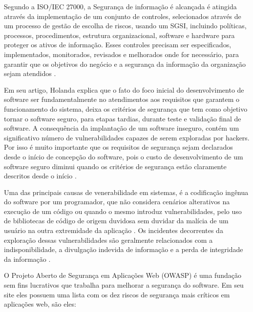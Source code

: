 Segundo a ISO/IEC 27000, a Segurança de informação é alcançada é atingida através da implementação de um conjunto de controles, selecionados através de um processo de gestão de escolha de riscos, usando um SGSI, incluindo políticas, processos, procedimentos, estrutura organizacional, software e hardware para proteger os ativos de informação. Esses controles precisam ser especificados, implementados, monitorados, revisados e melhorados onde for necessário, para garantir que  os objetivos do negócio e a segurança da informação da organização sejam atendidos \cite{ISO27000}.



Em seu artigo, Holanda \cite{holanda2009segurancca} explica que o fato do foco inicial do desenvolvimento de software ser fundamentalmente no atendimentos aos requisitos que garantem o funcionamento do sistema, deixa os critérios de segurança que tem como objetivo tornar o software seguro, para etapas tardias, durante teste e validação final de software. A consequência da implantação de um software inseguro, contém um significativo número de vulnerabilidades capazes de serem exploradas por hackers. Por isso é muito importante que os requisitos de segurança sejam declarados desde o início de concepção do software, pois o custo de desenvolvimento de um software seguro diminui quando os critérios de segurança estão claramente descritos desde o início \cite{holanda2009segurancca}.

Uma das principais causas de venerabilidade em sistemas, é a codificação ingênua do software por um programador, que não considera cenários alterativos na execução de um código ou quando o mesmo introduz vulnerabilidades, pelo uso de bibliotecas de código de origem duvidosa sem duvidar da malícia de um usuário na outra extremidade da aplicação \cite{holanda2009segurancca}. Os incidentes decorrentes da exploração dessas vulnerabilidades são geralmente relacionados com a indisponibilidade, a divulgação indevida de informação e a perda de integridade da informação \cite{holanda2009segurancca}.

O Projeto Aberto de Segurança em Aplicações Web (OWASP) é uma fundação sem fins lucrativos que trabalha para melhorar a segurança do software. Em seu site eles possuem uma lista \cite{owasp} com os dez riscos de segurança mais críticos em aplicações web, são eles:

